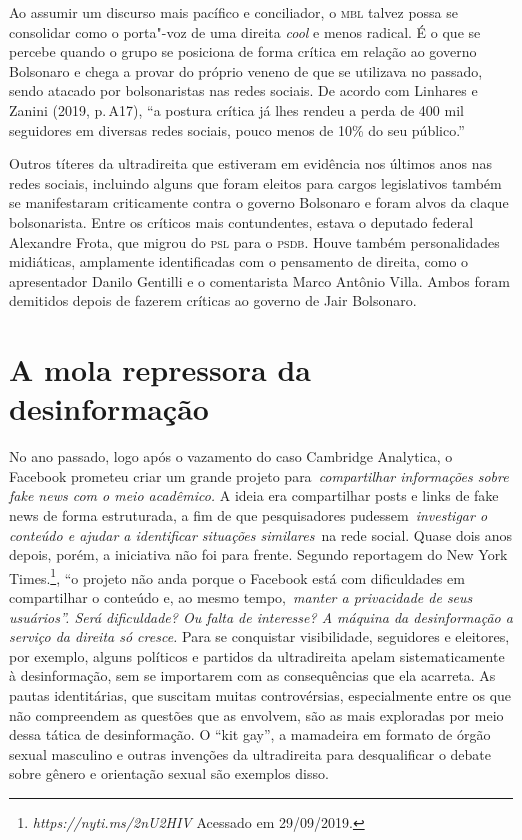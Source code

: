 Ao assumir um discurso mais pacífico e conciliador, o \textsc{mbl} talvez possa
se consolidar como o porta"-voz de uma direita \emph{cool} e menos
radical. É o que se percebe quando o grupo se posiciona de forma crítica
em relação ao governo Bolsonaro e chega a provar do próprio veneno de
que se utilizava no passado, sendo atacado por bolsonaristas nas redes
sociais. De acordo com Linhares e Zanini (2019, p.\,A17), ``a postura
crítica já lhes rendeu a perda de 400 mil seguidores em diversas redes
sociais, pouco menos de 10\% do seu público.''

Outros títeres da ultradireita que estiveram em evidência nos últimos
anos nas redes sociais, incluindo alguns que foram eleitos para cargos
legislativos também se manifestaram criticamente contra o governo
Bolsonaro e foram alvos da claque bolsonarista. Entre os críticos mais
contundentes, estava o deputado federal Alexandre Frota, que migrou do
\textsc{psl} para o \textsc{psdb}. Houve também personalidades midiáticas, amplamente
identificadas com o pensamento de direita, como o apresentador Danilo
Gentilli e o comentarista Marco Antônio Villa. Ambos foram demitidos
depois de fazerem críticas ao governo de Jair Bolsonaro.

\section{A mola repressora da desinformação}

No ano passado, logo após o vazamento do caso Cambridge Analytica, o
Facebook prometeu criar um grande projeto para~\emph{compartilhar
informações sobre fake news com o meio acadêmico.} A ideia era
compartilhar posts e links de fake news de forma estruturada, a fim de
que pesquisadores pudessem~\emph{investigar o conteúdo e ajudar a
identificar situações similares~}na rede social. Quase dois anos depois,
porém, a iniciativa não foi para frente. Segundo reportagem do New York
Times.\footnote{\emph{https://nyti.ms/2nU2HIV}
  Acessado em 29/09/2019.}, ``o projeto não anda porque o Facebook está
com dificuldades em compartilhar o conteúdo e, ao mesmo
tempo,~\emph{manter a privacidade de seus usuários''. Será
dificuldade? Ou falta de interesse? A máquina da desinformação a serviço
da direita só cresce.} Para se conquistar visibilidade, seguidores e
eleitores, por exemplo, alguns políticos e partidos da ultradireita
apelam sistematicamente à desinformação, sem se importarem com as
consequências que ela acarreta. As pautas identitárias, que suscitam
muitas controvérsias, especialmente entre os que não compreendem as
questões que as envolvem, são as mais exploradas por meio dessa tática
de desinformação. O ``kit gay'', a mamadeira em formato de órgão sexual
masculino e outras invenções da ultradireita para desqualificar o debate
sobre gênero e orientação sexual são exemplos disso.

